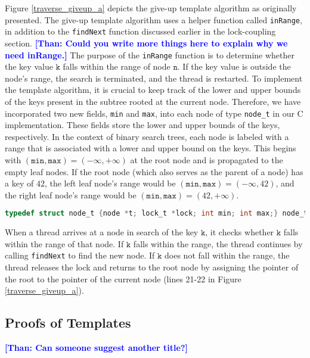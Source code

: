 \documentclass[a4paper,UKenglish,cleveref, autoref, thm-restate]{lipics-v2021}
\newcommand{\than}[1]{\textbf{\textcolor{blue}{[Than: #1]}}}
\newcommand{\wm}[1]{\textbf{\textcolor{violet}{[Willam: #1]}}}
\begin{document}
Figure \ref{traverse_giveup_a} depicts the give-up template algorithm as originally presented. The give-up template algorithm uses a helper function called \lstinline{inRange}, in addition to the \lstinline{findNext} function discussed earlier in the lock-coupling section. 
\than{Could you write more things here to explain why we need inRange.}
The purpose of the \lstinline{inRange} function is to determine whether the key value $\texttt{k}$ falls within the range of node $\texttt{n}$. If the key value is outside the node's range, the search is terminated, and the thread is restarted. To implement the template algorithm, it is crucial to keep track of the lower and upper bounds of the keys present in the subtree rooted at the current node. Therefore, we have incorporated two new fields, \lstinline{min} and \lstinline{max}, into each node of type \lstinline{node_t} in our C implementation. These fields store the lower and upper bounds of the keys, respectively. In the context of binary search trees, each node is labeled with a range that is associated with a lower and upper bound on the keys. This begins with $(\texttt{min}, \texttt{max}) = (-\infty, +\infty)$ at the root node and is propagated to the empty leaf nodes. If the root node (which also serves as the parent of a node) has a key of $42$, the left leaf node's range would be $(\texttt{min}, \texttt{max}) = (-\infty, 42)$, and the right leaf node's range would be $(\texttt{min}, \texttt{max}) = (42, +\infty)$.

\begin{lstlisting}[language = C, backgroundcolor=\color{white}, basicstyle=\ttfamily\footnotesize]
	typedef struct node_t {node *t; lock_t *lock; int min; int max;} node_t;
\end{lstlisting}



When a thread arrives at a node in search of the key $\texttt{k}$, it checks whether $\texttt{k}$ falls within the range of that node. If $\texttt{k}$ falls within the range, the thread continues by calling \lstinline{findNext} to find the new node. If $\texttt{k}$ does not fall within the range, the thread releases the lock and returns to the root node by assigning the pointer of the root to the pointer of the current node (lines 21-22 in Figure \ref{traverse_giveup_a}).

\subsection{Proofs of Templates} \than{Can someone suggest another title?}
\end{document}
